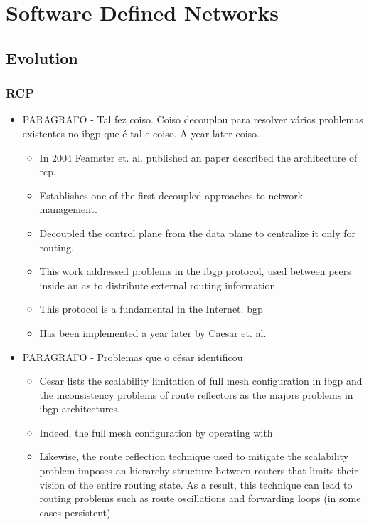 \section{Software Defined Networks}
\glsresetall
\label{sec:background:sdn}


\subsection{Evolution}

\subsubsection{RCP}

\begin{itemize}
\item PARAGRAFO - Tal fez coiso. Coiso  decouplou para resolver vários problemas existentes no ibgp que é tal e coiso. A year later coiso. 
\begin{itemize}
  \item  In 2004 Feamster et. al.  \cite{Feamster:2004tg} published an paper described the architecture of \gls{rcp}.
  \item Establishes one of the first decoupled approaches to network management. 
  \item Decoupled the control plane from the data plane to centralize it only for routing. 
  \item This work addressed problems in the \gls{ibgp} protocol, used between peers inside an \gls{as} to distribute external routing information. 
  \item  This protocol is a fundamental in the Internet. \gls{bgp}  
  \item  Has been implemented a year later by Caesar et. al.  \cite{Caesar:2005wsa}
\end{itemize}

\item PARAGRAFO - Problemas que o césar identificou
  \begin{itemize}
  \item Cesar lists the scalability limitation of full mesh configuration in \gls{ibgp} and the inconsistency problems of route reflectors as the majors problems in \gls{ibgp} architectures. 
  \item  Indeed, the full mesh configuration by operating with %
  \item Likewise, the route reflection technique used to mitigate the scalability problem imposes an hierarchy structure between routers that limits their vision of the entire routing state. As a result, this technique can lead to routing problems such as route oscillations and forwarding loops (in some cases persistent).  
  \end{itemize}



\end{itemize}
